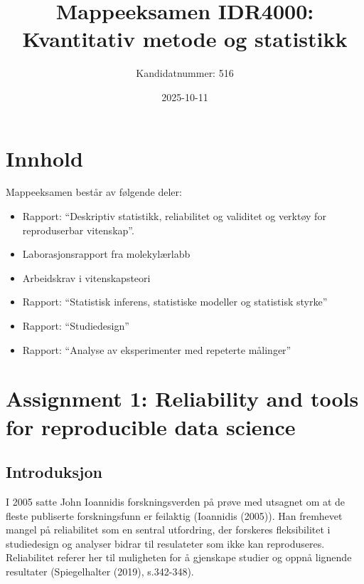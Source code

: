 \documentclass[
  letterpaper,
  DIV=11,
  numbers=noendperiod]{scrreprt}
\title{Mappeeksamen IDR4000: Kvantitativ metode og statistikk}
\author{Kandidatnummer: 516}
\date{2025-10-11}
\providecommand{\tightlist}{%
  \setlength{\itemsep}{0pt}\setlength{\parskip}{0pt}}\usepackage{longtable,booktabs,array}
\renewcommand*\contentsname{Table of contents}
\newcommand\contentsname{Table of contents}
\begin{document}
\maketitle

\renewcommand*\contentsname{Table of contents}
{
\hypersetup{linkcolor=}
\setcounter{tocdepth}{2}
\tableofcontents
}


\chapter{Innhold}\label{innhold}

Mappeeksamen består av følgende deler:

\begin{itemize}
\tightlist
\item
  Rapport: ``Deskriptiv statistikk, reliabilitet og validitet og verktøy
  for reproduserbar vitenskap''.
\item
  Laborasjonsrapport fra molekylærlabb
\item
  Arbeidskrav i vitenskapsteori
\item
  Rapport: ``Statistisk inferens, statistiske modeller og statistisk
  styrke''
\item
  Rapport: ``Studiedesign''
\item
  Rapport: ``Analyse av eksperimenter med repeterte målinger''
\end{itemize}


\chapter{Assignment 1: Reliability and tools for reproducible data
science}\label{assignment-1-reliability-and-tools-for-reproducible-data-science}

\section{Introduksjon}\label{introduksjon}

I 2005 satte John Ioannidis forskningsverden på prøve med utsagnet om at
de fleste publiserte forskningsfunn er feilaktig (Ioannidis (2005)). Han
fremhevet mangel på reliabilitet som en sentral utfordring, der
forskeres fleksibilitet i studiedesign og analyser bidrar til
resulateter som ikke kan reproduseres. Reliabilitet referer her til
muligheten for å gjenskape studier og oppnå lignende resultater
(Spiegelhalter (2019), s.342-348).
\end{document}
